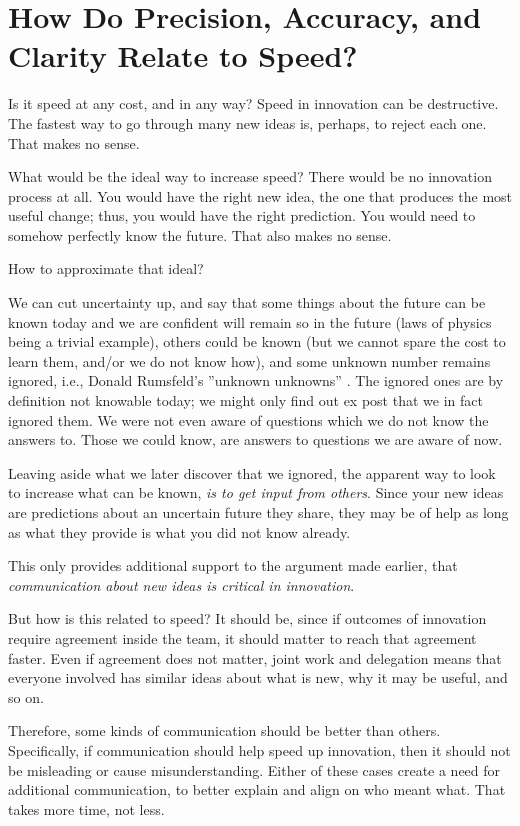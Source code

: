 \documentclass[graybox,envcountchap,sectrefs]{svmono}
\begin{document}
\section{How Do Precision, Accuracy, and Clarity Relate to Speed?}
\label{c2:s5}
Is it speed at any cost, and in any way? Speed in innovation can be destructive. The fastest way to go through many new ideas is, perhaps, to reject each one\cite{dougherty2008interpretive,dyer2009innovators,martins2003building}. That makes no sense.

What would be the ideal way to increase speed? There would be no innovation process at all. You would have the right new idea, the one that produces the most useful change; thus, you would have the right prediction. You would need to somehow perfectly know the future. That also makes no sense. 

How to approximate that ideal? 

We can cut uncertainty up, and say that some things about the future can be known today and we are confident will remain so in the future (laws of physics being a trivial example), others could be known (but we cannot spare the cost to learn them, and/or we do not know how), and some unknown number remains ignored, i.e., Donald Rumsfeld's ''unknown unknowns'' \cite{wikipedia-known-knowns}. The ignored ones are by definition not knowable today; we might only find out ex post that we in fact ignored them. We were not even aware of questions which we do not know the answers to. Those we could know, are answers to questions we are aware of now.

Leaving aside what we later discover that we ignored, the apparent way to look to increase what can be known, \textit{is to get input from others}. Since your new ideas are predictions about an uncertain future they share, they may be of help as long as what they provide is what you did not know already.

This only provides additional support to the argument made earlier, that \textit{communication about new ideas is critical in innovation}.

But how is this related to speed? It should be, since if outcomes of innovation require agreement inside the team, it should matter to reach that agreement faster. Even if agreement does not matter, joint work and delegation means that everyone involved has similar ideas about what is new, why it may be useful, and so on.

Therefore, some kinds of communication should be better than others. Specifically, if communication should help speed up innovation, then it should not be misleading or cause misunderstanding. Either of these cases create a need for additional communication, to better explain and align on who meant what. That takes more time, not less.
\end{document}
